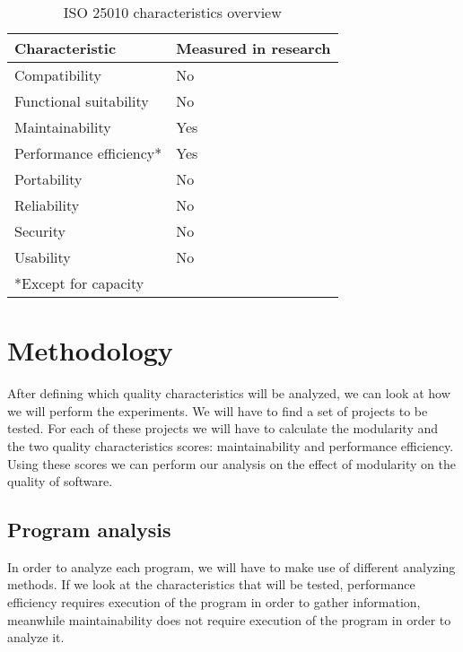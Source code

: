 \documentclass[twoside]{uva-inf-bachelor-thesis}
\begin{document}
\begin{table}[H]
\centering
\caption{ISO 25010 characteristics overview}
\label{table:overview}
\begin{tabular}{ll}
\multicolumn{1}{l|}{\textbf{Characteristic}} & \textbf{Measured in research} \\ \hline
\multicolumn{1}{l|}{Compatibility}           & No                            \\
\multicolumn{1}{l|}{Functional suitability}  & No                            \\
\multicolumn{1}{l|}{Maintainability}         & Yes                           \\
\multicolumn{1}{l|}{Performance efficiency*} & Yes                           \\
\multicolumn{1}{l|}{Portability}             & No                            \\
\multicolumn{1}{l|}{Reliability}             & No                            \\
\multicolumn{1}{l|}{Security}                & No                            \\
\multicolumn{1}{l|}{Usability}               & No                            \\
*Except for capacity                         &                              
\end{tabular}
\end{table}

\section{Methodology}
After defining which quality characteristics will be analyzed, we can look at how we will perform the experiments. We will have to find a set of projects to be tested. For each of these projects we will have to calculate the modularity and the two quality characteristics scores: maintainability and performance efficiency. Using these scores we can perform our analysis on the effect of modularity on the quality of software.

\subsection{Program analysis}
\label{method:analysis}
In order to analyze each program, we will have to make use of different analyzing methods. If we look at the characteristics that will be tested, performance efficiency requires execution of the program in order to gather information, meanwhile maintainability does not require execution of the program in order to analyze it.\\
\end{document}
